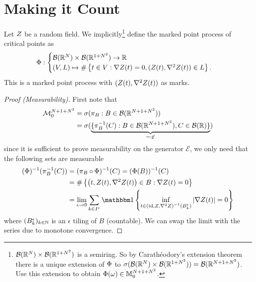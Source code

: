 \section{Making it Count}

\begin{definition}
	Let \(\rf\) be a random field. We implicitly\footnote{
		\(\borel(\real^\dims)\times\borel(\real^{1+\dims^2})\) is a semiring. So by
		Carathéodory's extension theorem there is a unique extension of
		\(\pp\) to
		\(\sigma(\borel(\real^\dims)\times\borel(\real^{1+\dims^2}))=\borel(\real^{\dims+1+\dims^2})\).
		Use this extension to obtain \(\pp(\omega)\in\locFiniteMeasure[\dims+1+\dims^2]\).
	} define the marked point process of critical points as
	\begin{align*}
		\pp:
		\begin{cases}
			\borel(\real^\dims)\times\borel(\real^{1+\dims^2}) \to \real\\
			(\Vol, L) \mapsto
			\#\left\{t\in\Vol:
				\nabla\rf(t)=0,
				(\rf(t), \nabla^2 \rf(t))\in L
			\right\}.
		\end{cases}
	\end{align*}
	This is a marked point process with \((\rf(t), \nabla^2\rf(t))\) as marks.
	
\end{definition}
\begin{proof}[Proof (Measurability)]
	First note that	
	\begin{align*}
		\locFiniteMeasAlg[\dims+1+\dims^2]
		&= \sigma(\pi_B : B\in\borel(\real^{\dims+1+\dims^2}))\\
		&=\sigma(\underbrace{
			\{\pi_B^{-1}(C) : B\in\borel(\real^{\dims+1+\dims^2}), C\in\borel(\real)\}
		}_{=:\mathcal{E}}
		)
	\end{align*}
	since it is sufficient to prove measurability on the generator
	\(\mathcal{E}\), we only need that the following sets are measurable
	\begin{align*}
		(\pp)^{-1}(\pi^{-1}_{B}(C))
		&= (\pi_{B} \circ \pp)^{-1}(C)
		= (\pp(B))^{-1}(C)\\
		&= \#\left\{\left(t,\rf(t),\nabla^2\rf(t)\right) \in B:
			\nabla\rf(t)=0
		\right\}\\
		&= \lim_{\epsilon\to 0} \sum_{k\in I^\epsilon}
		\ind\left\{
			\inf_{t\in \left(\text{id}, \rf, \nabla^2\rf\right)^{-1}(B^\epsilon_k) }
		|\nabla \rf(t)| = 0
		\right\}
	\end{align*}
	where \((B^\epsilon_k)_{k\in\nat}\) is an \(\epsilon\) tiling of \(B\) (countable).
	We can swap the limit with the series due to monotone convergence.
\end{proof}

